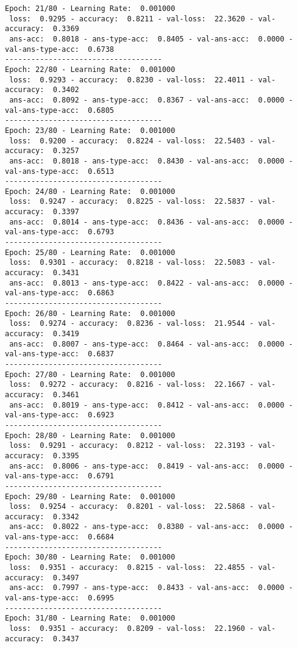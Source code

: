 \documentclass{report}
\begin{document}
\begin{verbatim}
Epoch: 21/80 - Learning Rate:  0.001000
 loss:  0.9295 - accuracy:  0.8211 - val-loss:  22.3620 - val-accuracy:  0.3369
 ans-acc:  0.8018 - ans-type-acc:  0.8405 - val-ans-acc:  0.0000 - val-ans-type-acc:  0.6738
------------------------------------
Epoch: 22/80 - Learning Rate:  0.001000
 loss:  0.9293 - accuracy:  0.8230 - val-loss:  22.4011 - val-accuracy:  0.3402
 ans-acc:  0.8092 - ans-type-acc:  0.8367 - val-ans-acc:  0.0000 - val-ans-type-acc:  0.6805
------------------------------------
Epoch: 23/80 - Learning Rate:  0.001000
 loss:  0.9200 - accuracy:  0.8224 - val-loss:  22.5403 - val-accuracy:  0.3257
 ans-acc:  0.8018 - ans-type-acc:  0.8430 - val-ans-acc:  0.0000 - val-ans-type-acc:  0.6513
------------------------------------
Epoch: 24/80 - Learning Rate:  0.001000
 loss:  0.9247 - accuracy:  0.8225 - val-loss:  22.5837 - val-accuracy:  0.3397
 ans-acc:  0.8014 - ans-type-acc:  0.8436 - val-ans-acc:  0.0000 - val-ans-type-acc:  0.6793
------------------------------------
Epoch: 25/80 - Learning Rate:  0.001000
 loss:  0.9301 - accuracy:  0.8218 - val-loss:  22.5083 - val-accuracy:  0.3431
 ans-acc:  0.8013 - ans-type-acc:  0.8422 - val-ans-acc:  0.0000 - val-ans-type-acc:  0.6863
------------------------------------
Epoch: 26/80 - Learning Rate:  0.001000
 loss:  0.9274 - accuracy:  0.8236 - val-loss:  21.9544 - val-accuracy:  0.3419
 ans-acc:  0.8007 - ans-type-acc:  0.8464 - val-ans-acc:  0.0000 - val-ans-type-acc:  0.6837
------------------------------------
Epoch: 27/80 - Learning Rate:  0.001000
 loss:  0.9272 - accuracy:  0.8216 - val-loss:  22.1667 - val-accuracy:  0.3461
 ans-acc:  0.8019 - ans-type-acc:  0.8412 - val-ans-acc:  0.0000 - val-ans-type-acc:  0.6923
------------------------------------
Epoch: 28/80 - Learning Rate:  0.001000
 loss:  0.9291 - accuracy:  0.8212 - val-loss:  22.3193 - val-accuracy:  0.3395
 ans-acc:  0.8006 - ans-type-acc:  0.8419 - val-ans-acc:  0.0000 - val-ans-type-acc:  0.6791
------------------------------------
Epoch: 29/80 - Learning Rate:  0.001000
 loss:  0.9254 - accuracy:  0.8201 - val-loss:  22.5868 - val-accuracy:  0.3342
 ans-acc:  0.8022 - ans-type-acc:  0.8380 - val-ans-acc:  0.0000 - val-ans-type-acc:  0.6684
------------------------------------
Epoch: 30/80 - Learning Rate:  0.001000
 loss:  0.9351 - accuracy:  0.8215 - val-loss:  22.4855 - val-accuracy:  0.3497
 ans-acc:  0.7997 - ans-type-acc:  0.8433 - val-ans-acc:  0.0000 - val-ans-type-acc:  0.6995
------------------------------------
Epoch: 31/80 - Learning Rate:  0.001000
 loss:  0.9351 - accuracy:  0.8209 - val-loss:  22.1960 - val-accuracy:  0.3437

\end{verbatim}
\end{document}
